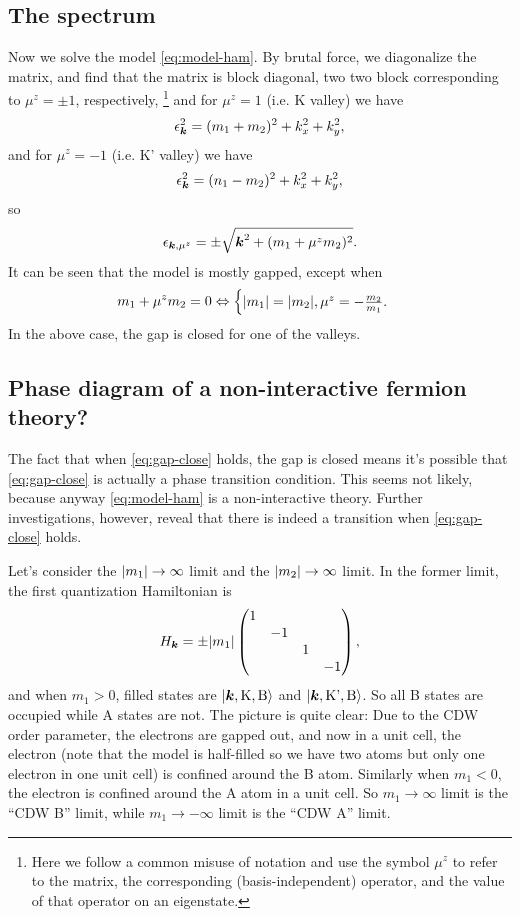 \documentclass[hyperref, a4paper]{article}
\def\\{}%
\begin{document}
\subsection{The spectrum}

Now we solve the model \eqref{eq:model-ham}.
By brutal force, we diagonalize the matrix,
and find that the matrix is block diagonal, 
two two block corresponding to $\mu^z = \pm 1$, respectively,%
\footnote{
    Here we follow a common misuse of notation 
    and use the symbol $\mu^z$ to refer to 
    the matrix, the corresponding (basis-independent) operator,
    and the value of that operator on an eigenstate.
}
and for $\mu^z = 1$ (i.e. K valley) we have 
\begin{equation}
    \epsilon_{\vb*{k}}^2 = (m_1 + m_2)^2 + k_x^2 + k_y^2,
\end{equation}
and for $\mu^z = -1$ (i.e. K' valley) we have 
\begin{equation}
    \epsilon_{\vb*{k}}^2 = (n_1 - m_2)^2 + k_x^2 + k_y^2,
\end{equation}
so 
\begin{equation}
    \epsilon_{\vb*{k}, \mu^z} = \pm \sqrt{
        \vb*{k}^2 + (m_1 + \mu^z m_2)^2
    }.
\end{equation}
It can be seen that the model is mostly gapped,
except when 
\begin{equation}
    m_1 + \mu^z m_2 = 0 \Leftrightarrow \begin{cases}
        \abs{m_1} = \abs{m_2}, \\
        \mu^z = - \frac{m_2}{m_1} .
    \end{cases}
    \label{eq:gap-close}
\end{equation}
In the above case, 
the gap is closed for one of the valleys.

\subsection{Phase diagram of a non-interactive fermion theory?}

The fact that when \eqref{eq:gap-close} holds,
the gap is closed 
means it's possible that \eqref{eq:gap-close} is actually a phase transition condition. 
This seems not likely,
because anyway \eqref{eq:model-ham} is a non-interactive theory.
Further investigations, however, reveal that there is indeed a transition when \eqref{eq:gap-close} holds.

Let's consider the $\abs{m_1} \to \infty$ limit and the $\abs{m_2} \to \infty$ limit.
In the former limit, the first quantization Hamiltonian is 
\[
    H_{\vb*{k}} = \pm \abs{m_1} \pmqty{\dmat{1, -1, 1, -1}},
\]
and when $m_1 > 0$, filled states are $\ket{\vb*{k}, \text{K}, \text{B}}$ 
and $\ket{\vb*{k}, \text{K'}, \text{B}}$.
So all B states are occupied while A states are not.
The picture is quite clear:
Due to the CDW order parameter,
the electrons are gapped out,
and now in a unit cell,
the electron (note that the model is half-filled so we have two atoms but only one electron in one unit cell)
is confined around the B atom.
Similarly when $m_1 < 0$, 
the electron is confined around the A atom in a unit cell.
So $m_1 \to \infty$ limit is the ``CDW B'' limit,
while $m_1 \to - \infty$ limit is the ``CDW A'' limit.
\end{document}
